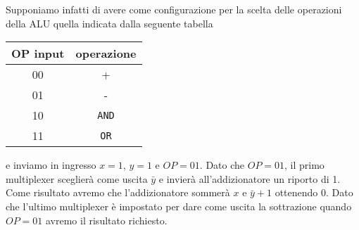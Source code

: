Supponiamo infatti di avere come configurazione per la scelta delle operazioni della ALU quella
indicata dalla seguente tabella
\begin{center}
	\begin{tabular}{c | c}
		OP input & operazione \\ \hline
		00       & +          \\
		01       & -          \\
		10       & \verb|AND| \\
		11       & \verb|OR|
	\end{tabular}
\end{center}
e inviamo in ingresso $x = 1$, $y = 1$ e $OP = 01$. Dato che $OP = 01$, il primo multiplexer
sceglierà come uscita $\bar{y}$ e invierà all'addizionatore un riporto di 1. Come risultato avremo
che l'addizionatore sommerà $x$ e $\bar{y} + 1$ ottenendo 0. Dato che l'ultimo multiplexer è
impostato per dare come uscita la sottrazione quando $OP = 01$ avremo il risultato richiesto.

